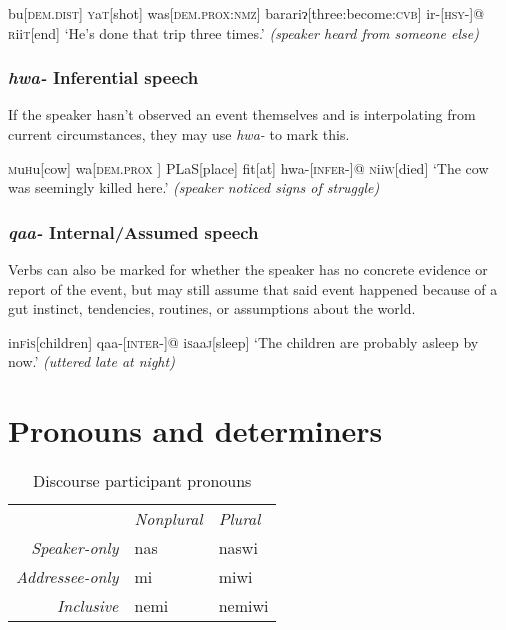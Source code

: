 \documentclass[a4paper,10pt,twoside,openright]{memoir}
\newcommand{\lilglot}{ɂ}
\newcommand{\famwordold}[5]{#1\textsc{#2}#3\textsc{#4}#5}
\begin{document}
\ex
\begingl
bu[\textsc{dem.dist}]
\famwordold{}{y}{a}{t}{}[shot]
was[\textsc{dem.prox:nmz}]
barari\lilglot[three:become:\textsc{cvb}]
ir-[\textsc{hsy-}]@
\famwordold{}{r}{ii}{t}{}[end]
\glft `He's done that trip three times.' \textit{(speaker heard from someone else)}
\endgl
\xe

\subsubsection{\emph{hwa-} Inferential speech}

If the speaker hasn't observed an event themselves and is interpolating from current circumstances, they may use \emph{hwa-} to mark this. 

\ex
\begingl
\famwordold{}{m}{u}{h}{u}[cow]
wa[\textsc{dem.prox
}]
\famwordold{}{PL}{a}{S}{}[place]
fit[at]
hwa-[\textsc{infer-}]@
\famwordold{}{n}{ii}{w}{}[died]
\glft `The cow was seemingly killed here.' \textit{(speaker noticed signs of struggle)}
\endgl
\xe

\subsubsection{\emph{qaa-} Internal/Assumed speech}

Verbs can also be marked for whether the speaker has no concrete evidence or report of the event, but may still assume that said event happened because of a gut instinct, tendencies, routines, or assumptions about the world.

\ex
\begingl
\famwordold{in}{f}{i}{s}{}[children]
qaa-[\textsc{inter-}]@
\famwordold{i}{s}{aa}{j}{}[sleep]
\glft `The children are probably asleep by now.' \textit{(uttered late at night)}
\endgl
\xe

\newpage
\section{Pronouns and determiners}

\begin{table}[ht]
    \centering
    \begin{tabular}{rll}
        & \textit{Nonplural} & \textit{Plural} \\
    \textit{Speaker-only} & nas & naswi \\
    \textit{Addressee-only} & mi & miwi \\
    \textit{Inclusive} & nemi & nemiwi \\
    \end{tabular}
    \caption{Discourse participant pronouns}
    \label{tab:firstandsecond}
\end{table}
\end{document}
